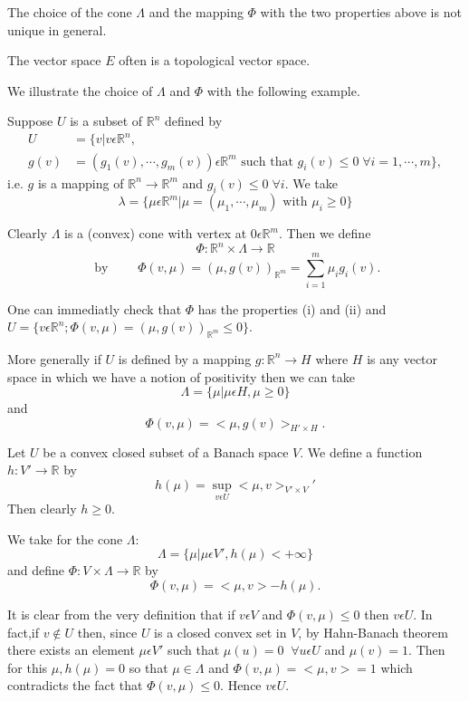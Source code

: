 The choice of the cone $\Lambda$ and the mapping $\Phi$ with the two properties above is not unique in general.

The vector space $E$ often is a topological vector space.

We illustrate the choice of $\Lambda$ and $\Phi$ with the following example.

\begin{example}\label{chap5-exam1.1}
Suppose $U$ is a subset of $\mathbb{R}^{n}$ defined by
\begin{align*}
U &= \{v | v \epsilon \mathbb{R}^{n},\\ 
g(v) &= (g_{1}(v), \cdots, g_{m}(v)) \epsilon \mathbb{R}^{m} \text{ such that } g_{i}(v) \leq 0 \; \forall i = 1, \cdots, m\},
\end{align*}
i.e. $g$ is a mapping of $\mathbb{R}^{n} \to \mathbb{R}^{m}$ and $g_{i}(v) \leq 0 \; \forall i$. We take
$$
\lambda = \{\mu \epsilon \mathbb{R}^{m} |\mu = (\mu_{1}, \cdots, \mu_{m}) \text{ with } \mu_{i} \geq 0\}
$$

Clearly $\Lambda$ is a (convex) cone with vertex at $0 \epsilon \mathbb{R}^{m}$. Then we define
$$
\Phi :\mathbb{R}^{n} \times \Lambda \to \mathbb{R}
$$
$$
\text{ by } \qquad \Phi(v, \mu) = (\mu, g(v))_{\mathbb{R}^{m}} = \sum_{i=1}^{m} \mu_{i} g_{i} (v).
$$
\end{example}

One can immediatly check that $\Phi$ has the properties (i) and (ii) and $U = \{v \epsilon \mathbb{R}^{n} ; \Phi (v, \mu) = (\mu, g(v))_{\mathbb{R}^{m}} \leq 0\}$.

More generally if $U$ is defined by a mapping $g : \mathbb{R}^{n} \to H$ where $H$ is any vector space in which we have a notion of positivity then we can take
$$
\Lambda = \{\mu | \mu \epsilon H, \mu \geq 0\}
$$
and\pageoriginale
$$
\Phi (v, \mu) = <\mu, g(v)>_{H' \times H}.
$$

\begin{example}\label{chap5-exam1.2}
Let $U$ be a convex closed subset of a Banach space $V$. We define a function $h : V' \to \mathbb{R}$ by
$$
h(\mu) = \sup_{v \epsilon U} <\mu, v>_{V' \times V}'
$$
Then clearly $h \geq 0$.

We take for the cone $\Lambda$:
$$
\Lambda = \{\mu | \mu \epsilon V', h(\mu) < + \infty \}
$$
and define $\Phi : V \times \Lambda \to \mathbb{R}$ by
$$
\Phi(v, \mu) = <\mu, v> -h(\mu).
$$
\end{example}

It is clear from the very definition that if $v \epsilon V$ and $\Phi (v, \mu) \leq 0$ then $v \epsilon U$. In fact,if $v \notin U$ then, since $U$ is a closed convex set in $V$, by Hahn-Banach theorem there exists an element $\mu \epsilon V'$ such that $\mu(u) = 0 \;\; \forall u \epsilon U$ and $\mu(v) = 1$. Then for this $\mu, h(\mu) = 0$ so that $\mu\in \Lambda$ and $\Phi (v, \mu) = <\mu, v> = 1$ which contradicts the fact that $\Phi(v, \mu) \leq 0$. Hence $v \epsilon U$.

